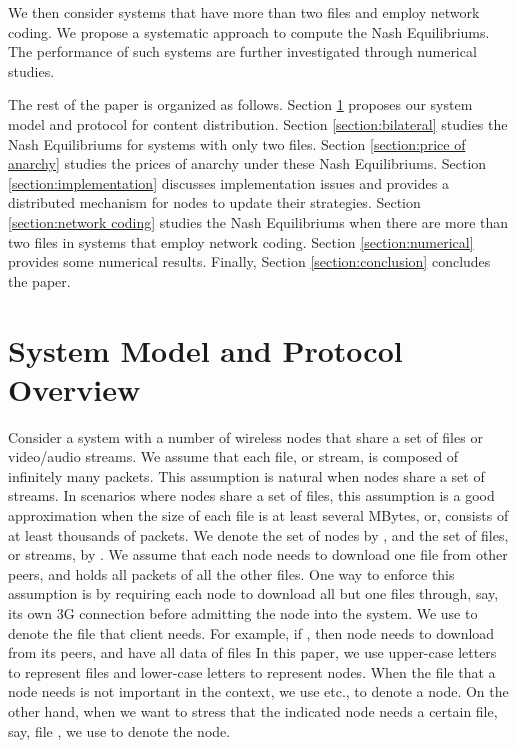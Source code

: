 \documentclass[11pt, conference]{IEEEtran}
\begin{document}
We then consider systems that have more than two files and employ network coding. We propose a systematic approach to compute the Nash Equilibriums. The performance of such systems are further investigated through numerical studies.

The rest of the paper is organized as follows. Section \ref{section:protocol} proposes our system model and protocol for content distribution. Section \ref{section:bilateral} studies the Nash Equilibriums for systems with only two files. Section \ref{section:price of anarchy} studies the prices of anarchy under these Nash Equilibriums. Section \ref{section:implementation} discusses implementation issues and provides a distributed mechanism for nodes to update their strategies. Section \ref{section:network coding} studies the Nash Equilibriums when there are more than two files in systems that employ network coding. Section \ref{section:numerical} provides some numerical results. Finally, Section \ref{section:conclusion} concludes the paper.







\section{System Model and Protocol Overview}
\label{section:protocol}

Consider a system with a number of wireless nodes that share a set of files or video/audio streams. We assume that each file, or stream, is composed of infinitely many packets. This assumption is natural when nodes share a set of streams. In scenarios where nodes share a set of files, this assumption is a good approximation when the size of each file is at least several MBytes, or, consists of at least thousands of packets. We denote the set of nodes by , and the set of files, or streams, by . We assume that each node needs to download one file from other peers, and holds all packets of all the other files. One way to enforce this assumption is by requiring each node to download all but one files through, say, its own 3G connection before admitting the node into the system. We use  to denote the file that client needs. For example, if , then node  needs to download  from its peers, and have all data of files  In this paper, we use upper-case letters to represent files and lower-case letters to represent nodes. When the file that a node needs is not important in the context, we use  etc., to denote a node. On the other hand, when we want to stress that the indicated node needs a certain file, say, file , we use  to denote the node.
\end{document}
